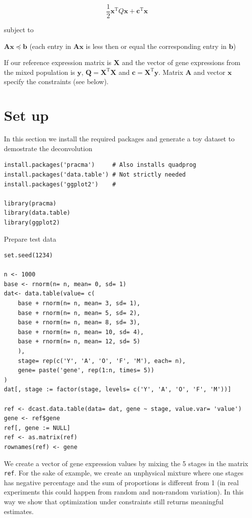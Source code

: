 \documentclass[11pt, fleqn]{article}
\begin{document}
\begin{equation}
\frac{1}{2} \mathbf{x}^\mathrm{T} Q\mathbf{x} + \mathbf{c}^\mathrm{T} \mathbf{x}
\end{equation}

subject to

$\mathbf{Ax} \preceq \mathbf{b}$ (each entry in $\mathbf{Ax}$ is less then or equal the corresponding entry in $\mathbf{b}$)

If our reference expression matrix is $\mathbf{X}$ and the vector of gene
expressions from the mixed population is $\mathbf{y}$, $\mathbf{Q} =
\mathbf{X}^\mathrm{T}\mathbf{X}$ and $\mathbf{c} =
\mathbf{X}^\mathrm{T}\mathbf{y}$. Matrix $\mathbf{A}$ and vector $\mathbf{x}$
specify the constraints (see below).

\section{Set up}

In this section we install the required packages and generate a toy dataset to demostrate the deconvolution

\begin{Verbatim}[formatcom=\color{violet}, fontsize=\small]
install.packages('pracma')     # Also installs quadprog
install.packages('data.table') # Not strictly needed
install.packages('ggplot2')    #

library(pracma)
library(data.table)
library(ggplot2)
\end{Verbatim}

Prepare test data

\begin{Verbatim}[formatcom=\color{violet}, fontsize=\small]
set.seed(1234)

n <- 1000
base <- rnorm(n= n, mean= 0, sd= 1)
dat<- data.table(value= c(
    base + rnorm(n= n, mean= 3, sd= 1),
    base + rnorm(n= n, mean= 5, sd= 2),
    base + rnorm(n= n, mean= 8, sd= 3),
    base + rnorm(n= n, mean= 10, sd= 4),
    base + rnorm(n= n, mean= 12, sd= 5)
    ),
    stage= rep(c('Y', 'A', 'O', 'F', 'M'), each= n),
    gene= paste('gene', rep(1:n, times= 5))
)
dat[, stage := factor(stage, levels= c('Y', 'A', 'O', 'F', 'M'))]

ref <- dcast.data.table(data= dat, gene ~ stage, value.var= 'value')
gene <- ref$gene
ref[, gene := NULL]
ref <- as.matrix(ref)
rownames(ref) <- gene
\end{Verbatim}

We create a vector of gene expression values by mixing the 5 stages in the
matrix \texttt{ref}. For the sake of example, we create an unphysical mixture
where one stages has negative percentage and the sum of proportions is different
from 1 (in real experiments this could happen from random and non-random
variation). In this way we show that optimization under constraints still
returns meaningful estimates.
\end{document}
